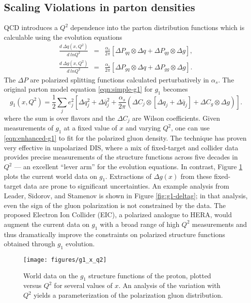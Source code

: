\subsection{Scaling Violations in parton densities}

QCD introduces a \(Q^2\) dependence into the parton distribution functions which is calculable using the evolution equations
%
\begin{eqnarray}
  \frac{d~\Delta q(x,Q^2)}{d~ln Q^2} &=& \frac{\alpha_s}{2 \pi} \left[ \Delta P_{qq} \otimes \Delta q + \Delta P_{qg} \otimes \Delta g \right], \nonumber \\
  \frac{d~\Delta g(x,Q^2)}{d~ln Q^2} &=& \frac{\alpha_s}{2 \pi} \left[ \Delta P_{gq} \otimes \Delta q + \Delta P_{gg} \otimes \Delta g \right].
\end{eqnarray}
%
The \(\Delta P\) are polarized splitting functions calculated perturbatively in \(\alpha_s\).  The original parton model equation \ref{eqn:simple-g1} for \(g_1\) becomes
%
\begin{equation}
  g_1(x, Q^2) = \frac{1}{2} \sum_{j} e_j^2 \left[\Delta q_j^2 + \Delta \bar{q}_j^2 + \frac{\alpha_s}{2 \pi} \left(\Delta C_j \otimes \left[\Delta q_j + \Delta \bar{q}_j\right] + \Delta C_g \otimes \Delta g\right)\right].
  \label{eqn:enhanced-g1}
\end{equation}
%
where the sum is over flavors and the \(\Delta C_j\) are Wilson coefficients.
Given measurements of \(g_1\) at a fixed value of \(x\) and varying \(Q^2\), one
can use \ref{eqn:enhanced-g1} to fit for the polarized gluon density. The
technique has proven very effective in unpolarized DIS, where a mix of
fixed-target and collider data provides precise measurements of the structure
functions across five decades in \(Q^2\) --- an excellent ``lever arm'' for the
evolution equations. In contrast, Figure \ref{fig:g1-versus-q2} plots the
current world data on \(g_1\). Extractions of \(\Delta g(x)\) from these
fixed-target data are prone to significant uncertainties. An example analysis
from Leader, Sidorov, and Stamenov is shown in Figure \ref{fig:g1-deltag}; in
that analysis, even the sign of the gluon polarization is not constrained by the
data. The proposed Electron Ion Collider (EIC), a polarized analogue to HERA,
would augment the current data on \(g_1\) with a broad range of high \(Q^2\)
measurements and thus dramatically improve the constraints on polarized
structure functions obtained through \(g_1\) evolution.

\begin{figure}
  \centering
  \texttt{[image: figures/g1\_x\_q2]}
  \caption{World data on the $g_1$ structure functions of the proton, plotted
  versus $Q^2$ for several values of $x$. An analysis of the variation with
  $Q^2$ yields a parameterization of the polarization gluon distribution.}
  \label{fig:g1-versus-q2}
\end{figure}

